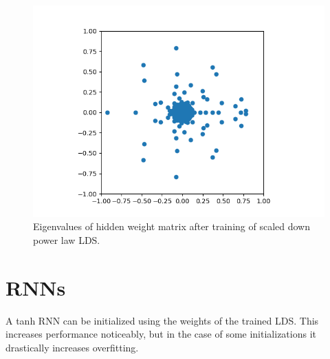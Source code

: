 \documentclass{article}
\begin{document}
\begin{figure}
    \centering
    \includegraphics{figures/scrit_lds_eigs.png}
    \caption{Eigenvalues of hidden weight matrix after training of scaled down power law LDS.}
\end{figure}

\section{RNNs}

A tanh RNN can be initialized using the weights of the trained LDS. This increases performance noticeably, but in the case of some initializations it drastically increases overfitting.
\end{document}
